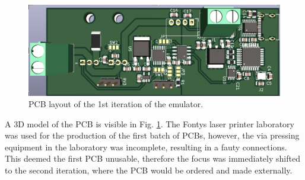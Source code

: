 \begin{figure}[h]
    \centering
    \includegraphics[scale=0.45]{pcb_1st_iteration.png}
    \caption{PCB layout of the 1st iteration of the emulator.}
    \label{fig:1st_pcb}
\end{figure}

A 3D model of the PCB is visible in Fig. \ref{fig:1st_pcb}.
The Fontys laser printer laboratory was used for the production 
of the first batch of PCBs, however, the via pressing equipment in the 
laboratory was incomplete, resulting in a fauty connections. 
This deemed the first PCB unusable, therefore the focus was 
immediately shifted to the second iteration, where the PCB 
would be ordered and made externally.